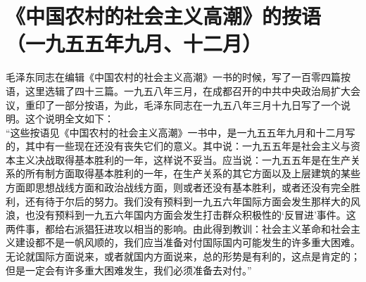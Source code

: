 \documentclass[cn,11pt,chinese]{elegantbook}
\def\myformat#1{\hfil\hfil #1}
\begin{document}
\section*{\myformat{《中国农村的社会主义高潮》的按语}\\\myformat{（一九五五年九月、十二月）}}
\begin{introduction}
\item 毛泽东同志在编辑《中国农村的社会主义高潮》一书的时候，写了一百零四篇按语，这里选辑了四十三篇。一九五八年三月，在成都召开的中共中央政治局扩大会议，重印了一部分按语，为此，毛泽东同志在一九五八年三月十九日写了一个说明。这个说明全文如下：\\
“这些按语见《中国农村的社会主义高潮》一书中，是一九五五年九月和十二月写的，其中有一些现在还没有丧失它们的意义。其中说：一九五五年是社会主义与资本主义决战取得基本胜利的一年，这样说不妥当。应当说：一九五五年是在生产关系的所有制方面取得基本胜利的一年，在生产关系的其它方面以及上层建筑的某些方面即思想战线方面和政治战线方面，则或者还没有基本胜利，或者还没有完全胜利，还有待于尔后的努力。我们没有预料到一九五六年国际方面会发生那样大的风浪，也没有预料到一九五六年国内方面会发生打击群众积极性的‘反冒进’事件。这两件事，都给右派猖狂进攻以相当的影响。由此得到教训：社会主义革命和社会主义建设都不是一帆风顺的，我们应当准备对付国际国内可能发生的许多重大困难。无论就国际方面说来，或者就国内方面说来，总的形势是有利的，这点是肯定的；但是一定会有许多重大困难发生，我们必须准备去对付。”
\end{introduction}
\end{document}
